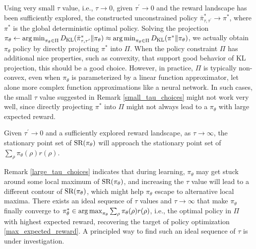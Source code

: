 Using very small $\tau$ value, i.e., $\tau \to 0$, given $\tau^{\prime} \to 0$ and the reward landscape has been sufficiently explored, the constructed unconstrained policy $\bar{\pi}_{\tau,\tau^{\prime}}^* \to \pi^*$, where $\pi^*$ is the global deterministic optimal policy. Solving the projection $\pi_\theta \leftarrow \operatorname*{arg\,min}_{\pi_\theta \in \Pi}{D_{\mathrm{KL}}(\bar{\pi}_{\tau,\tau^{\prime}}^* \| \pi_\theta}) \approx \operatorname*{arg\,min}_{\pi_\theta \in \Pi}{D_{\mathrm{KL}}(\pi^* \| \pi_\theta})$, we actually obtain $\pi_\theta$ policy by directly projecting $\pi^*$ into $\Pi$. When the policy constraint $\Pi$ has additional nice properties, such as convexity, that support good behavior of KL projection, this should be a good choice.
However, in practice, $\Pi$ is typically non-convex, even when $\pi_\theta$ is parameterized by a linear function approximator, let alone more complex function approximations like a neural network. In such cases, the small $\tau$ value suggested in Remark \ref{small_tau_choices} might not work very well, since directly projecting $\pi^*$ into $\Pi$ might not always lead to a $\pi_\theta$ with large expected reward.

\begin{remk}
\label{large_tau_choices}
	Given $\tau^{\prime} \to 0$ and a sufficiently explored reward landscape, as $\tau \to \infty$, the stationary point set of $\text{SR}(\pi_\theta)$ will approach the stationary point set of $\sum_{\rho}{ \pi_\theta(\rho) r(\rho) }$.
\end{remk}
 
Remark \ref{large_tau_choices} indicates that during learning, $\pi_\theta$ may get stuck around some local maximum of $\text{SR}(\pi_\theta)$, and increasing the $\tau$ value will lead to a different contour of $\text{SR}(\pi_\theta)$, which might help $\pi_\theta$ escape to alternative local maxima. There exists an ideal sequence of $\tau$ values and $\tau \to \infty$ that make $\pi_\theta$ finally converge to $\pi_\theta^* \in \operatorname*{arg\,max}_{\pi_\theta}{ \sum_{\rho}{\pi_\theta(\rho) r(\rho)} }$, i.e., the optimal policy in $\Pi$ with highest expected reward, recovering the target of policy optimization \cref{max_expected_reward}. A principled way to find such an ideal sequence of $\tau$ is under investigation.
 \fi
 
